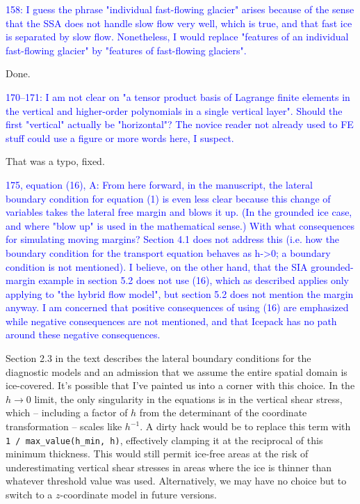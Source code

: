 \documentclass{article}
\theoremstyle{definition}
\theoremstyle{plain}
\begin{document}
\textcolor{blue}{158:  I guess the phrase "individual fast-flowing glacier" arises because of the sense that the SSA does not handle slow flow very well, which is true, and that fast ice is separated by slow flow.  Nonetheless, I would replace "features of an individual fast-flowing glacier" by "features of fast-flowing glaciers".}

Done.

\textcolor{blue}{170--171:  I am not clear on "a tensor product basis of Lagrange finite elements in the vertical and higher-order polynomials in a single vertical layer".  Should the first "vertical" actually be "horizontal"?  The novice reader not already used to FE stuff could use a figure or more words here, I suspect.}

That was a typo, fixed.

\textcolor{blue}{175, equation (16), A:  From here forward, in the manuscript, the lateral boundary condition for equation (1) is even less clear because this change of variables takes the lateral free margin and blows it up.  (In the grounded ice case, and where "blow up" is used in the mathematical sense.)  With what consequences for simulating moving margins?  Section 4.1 does not address this (i.e. how the boundary condition for the transport equation behaves as h->0; a boundary condition is not mentioned).  I believe, on the other hand, that the SIA grounded-margin example in section 5.2 does not use (16), which as described applies only applying to "the hybrid flow model", but section 5.2 does not mention the margin anyway.  I am concerned that positive consequences of using (16) are emphasized while negative consequences are not mentioned, and that Icepack has no path around these negative consequences.}

Section 2.3 in the text describes the lateral boundary conditions for the diagnostic models and an admission that we assume the entire spatial domain is ice-covered.
It's possible that I've painted us into a corner with this choice.
In the $h \to 0$ limit, the only singularity in the equations is in the vertical shear stress, which -- including a factor of $h$ from the determinant of the coordinate transformation -- scales like $h^{-1}$.
A dirty hack would be to replace this term with \texttt{1 / max\_value(h\_min, h)}, effectively clamping it at the reciprocal of this minimum thickness.
This would still permit ice-free areas at the risk of underestimating vertical shear stresses in areas where the ice is thinner than whatever threshold value was used.
Alternatively, we may have no choice but to switch to a $z$-coordinate model in future versions.
\end{document}
